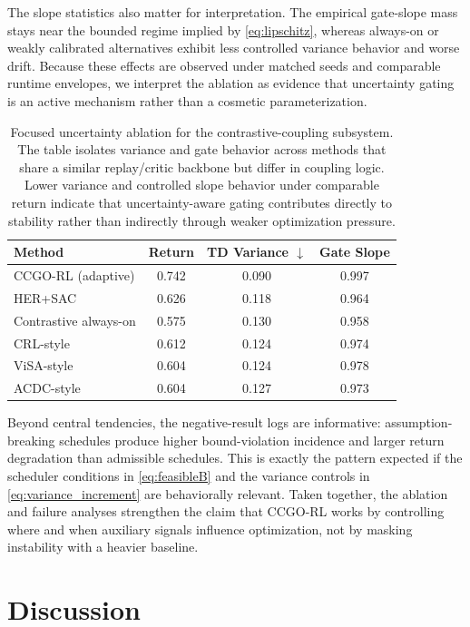 \documentclass{article} %
\begin{document}
The slope statistics also matter for interpretation. The empirical gate-slope mass stays near the bounded regime implied by \eqref{eq:lipschitz}, whereas always-on or weakly calibrated alternatives exhibit less controlled variance behavior and worse drift. Because these effects are observed under matched seeds and comparable runtime envelopes, we interpret the ablation as evidence that uncertainty gating is an active mechanism rather than a cosmetic parameterization.

\begin{table}[t]
\caption{Focused uncertainty ablation for the contrastive-coupling subsystem. The table isolates variance and gate behavior across methods that share a similar replay/critic backbone but differ in coupling logic. Lower variance and controlled slope behavior under comparable return indicate that uncertainty-aware gating contributes directly to stability rather than indirectly through weaker optimization pressure.}
\label{tab:h2_ablation_main}
\centering
\small
\renewcommand{\arraystretch}{1.1}
\setlength{\tabcolsep}{4pt}
\begin{tabular}{lccc}
\hline
Method & Return & TD Variance $\downarrow$ & Gate Slope \\
\hline
CCGO-RL (adaptive) & 0.742 & 0.090 & 0.997 \\
HER+SAC & 0.626 & 0.118 & 0.964 \\
Contrastive always-on & 0.575 & 0.130 & 0.958 \\
CRL-style & 0.612 & 0.124 & 0.974 \\
ViSA-style & 0.604 & 0.124 & 0.978 \\
ACDC-style & 0.604 & 0.127 & 0.973 \\
\hline
\end{tabular}
\end{table}

Beyond central tendencies, the negative-result logs are informative: assumption-breaking schedules produce higher bound-violation incidence and larger return degradation than admissible schedules. This is exactly the pattern expected if the scheduler conditions in \eqref{eq:feasibleB} and the variance controls in \eqref{eq:variance_increment} are behaviorally relevant. Taken together, the ablation and failure analyses strengthen the claim that CCGO-RL works by controlling where and when auxiliary signals influence optimization, not by masking instability with a heavier baseline.

\section{Discussion}
\label{sec:discussion}
\end{document}
